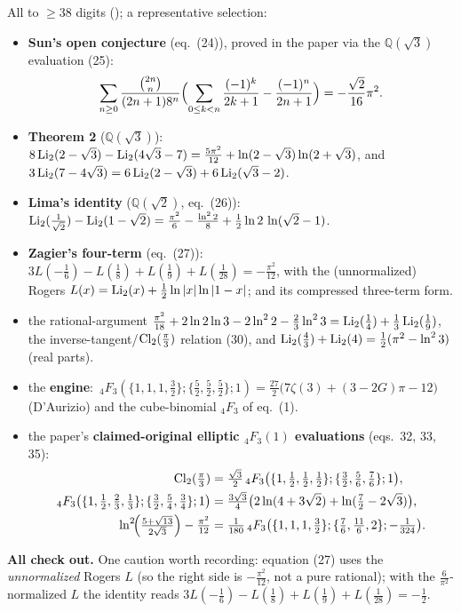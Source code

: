 All to $\ge38$ digits (); a representative selection:
\begin{itemize}
\item \textbf{Sun's open conjecture} (eq.\ (24)), proved in the paper via the $\mathbb{Q}(\sqrt3)$
  evaluation (25):
  \[ \sum_{n\ge0}\frac{\binom{2n}{n}}{(2n+1)8^{n}}\Bigl(\sum_{0\le k<n}\frac{(-1)^k}{2k+1}-\frac{(-1)^n}{2n+1}\Bigr)=-\frac{\sqrt2}{16}\pi^2. \]
\item \textbf{Theorem 2} ($\mathbb{Q}(\sqrt3)$):
  $8\operatorname{Li}_2(2-\sqrt3)-\operatorname{Li}_2(4\sqrt3-7)=\tfrac{5\pi^2}{12}+\ln(2-\sqrt3)\ln(2+\sqrt3)$,
  and $3\operatorname{Li}_2(7-4\sqrt3)=6\operatorname{Li}_2(2-\sqrt3)+6\operatorname{Li}_2(\sqrt3-2)$.
\item \textbf{Lima's identity} ($\mathbb{Q}(\sqrt2)$, eq.\ (26)):
  $\operatorname{Li}_2(\tfrac1{\sqrt2})-\operatorname{Li}_2(1-\sqrt2)=\tfrac{\pi^2}6-\tfrac{\ln^2 2}8+\tfrac12\ln2\,\ln(\sqrt2-1)$.
\item \textbf{Zagier's four-term} (eq.\ (27)): $3L(-\tfrac16)-L(\tfrac18)+L(\tfrac19)+L(\tfrac1{28})=-\tfrac{\pi^2}{12}$,
  with the (unnormalized) Rogers $L(x)=\operatorname{Li}_2(x)+\tfrac12\ln|x|\ln|1-x|$; and its compressed three-term form.
\item the rational-argument $\tfrac{\pi^2}{18}+2\ln2\ln3-2\ln^2 2-\tfrac23\ln^2 3=\operatorname{Li}_2(\tfrac14)+\tfrac13\operatorname{Li}_2(\tfrac19)$,
  the inverse-tangent/$\operatorname{Cl}_2(\tfrac\pi3)$ relation (30), and $\operatorname{Li}_2(\tfrac43)+\operatorname{Li}_2(4)=\tfrac12(\pi^2-\ln^2 3)$ (real parts).
\item the \textbf{engine}: $\,{}_4F_3(\{1,1,1,\tfrac32\};\{\tfrac52,\tfrac52,\tfrac52\};1)=\tfrac{27}2\bigl(7\zeta(3)+(3-2G)\pi-12\bigr)$
  (D'Aurizio) and the cube-binomial $_4F_3$ of eq.\ (1).
\item the paper's \textbf{claimed-original elliptic $_4F_3(1)$ evaluations} (eqs.\ 32, 33, 35):
  \begin{align*}
   \operatorname{Cl}_2(\tfrac\pi3)&=\tfrac{\sqrt3}2\,{}_4F_3\bigl(\{1,\tfrac12,\tfrac12,\tfrac12\};\{\tfrac32,\tfrac56,\tfrac76\};1\bigr),\\
   {}_4F_3\bigl(\{1,\tfrac12,\tfrac23,\tfrac13\};\{\tfrac32,\tfrac54,\tfrac34\};1\bigr)&=\tfrac{3\sqrt3}4\bigl(2\ln(4+3\sqrt2)+\ln(\tfrac72-2\sqrt3)\bigr),\\
   \ln^2\!\Bigl(\tfrac{5+\sqrt{13}}{2\sqrt3}\Bigr)-\tfrac{\pi^2}{12}&=\tfrac1{180}\,{}_4F_3\bigl(\{1,1,1,\tfrac32\};\{\tfrac76,\tfrac{11}6,2\};-\tfrac1{324}\bigr).
  \end{align*}
\end{itemize}
\textbf{All check out.} One caution worth recording: equation (27) uses the \emph{unnormalized} Rogers
$L$ (so the right side is $-\tfrac{\pi^2}{12}$, not a pure rational); with the $\tfrac6{\pi^2}$-normalized
$L$ the identity reads $3L(-\tfrac16)-L(\tfrac18)+L(\tfrac19)+L(\tfrac1{28})=-\tfrac12$.

